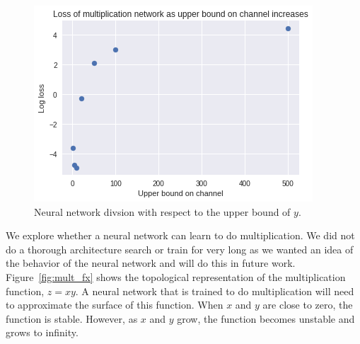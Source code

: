 

\begin{figure}
\begin{center}
\includegraphics{figures/equal/Channel_upper_bound_multiplication.png}
\caption{Neural network divsion with respect to the upper bound of $y$.}
\label{fig:mult_bound}
\end{center}
\end{figure}

We explore whether a neural network can learn to do multiplication. We did not do a thorough architecture search or train for very long as we wanted an idea of the behavior of the neural network and will do this in future work. 
Figure~\ref{fig:mult_fx} shows the topological representation of the multiplication function, $z=xy$.  A neural network that is trained to do multiplication will need to approximate the surface of this function.  
When $x$ and $y$ are close to zero, the function is stable.  However, as $x$ and $y$ grow, the function becomes unstable and grows to infinity. 


